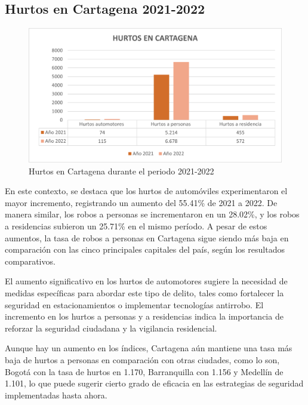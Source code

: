 \documentclass[letterpaper, 12pt]{article}
\begin{document}
\subsection*{Hurtos en Cartagena 2021-2022}

\begin{figure}
    \begin{center}
        \includegraphics[width=.8\linewidth]{./Images/Graph.HurtosCartagena.png}
        \caption{Hurtos en Cartagena durante el periodo 2021-2022}
        \label{fig:Graph.HurtosCartagena}
    \end{center}
\end{figure}

En este contexto, se destaca que los hurtos de automóviles
experimentaron el mayor incremento, registrando un aumento
del 55.41\% de 2021 a 2022. De manera similar, los robos a
personas se incrementaron en un 28.02\%, y los robos a
residencias subieron un 25.71\% en el mismo período. A
pesar de estos aumentos, la tasa de robos a personas en
Cartagena sigue siendo más baja en comparación con las
cinco principales capitales del país, según los resultados
comparativos.

El aumento significativo en los hurtos de automotores
sugiere la necesidad de medidas específicas para abordar
este tipo de delito, tales como fortalecer la seguridad en
estacionamientos o implementar tecnologías antirrobo. El
incremento en los hurtos a personas y a residencias indica
la importancia de reforzar la seguridad ciudadana y la
vigilancia residencial.

Aunque hay un aumento en los índices, Cartagena aún
mantiene una tasa más baja de hurtos a personas en
comparación con otras ciudades, como lo son, Bogotá con la
tasa de hurtos en 1.170, Barranquilla con 1.156 y Medellín
de 1.101, lo que puede sugerir cierto grado de eficacia en
las estrategias de seguridad implementadas hasta ahora.

\newpage

\printbibliography
\end{document}
